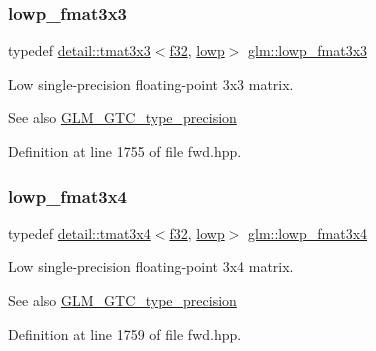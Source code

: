 \subsubsection{\texorpdfstring{lowp\+\_\+fmat3x3}{lowp\_fmat3x3}}
{\footnotesize\ttfamily typedef \hyperlink{structglm_1_1detail_1_1tmat3x3}{detail\+::tmat3x3}$<$\hyperlink{group__gtc__type__precision_ga0ec999b57f5330d9021256e96038df04}{f32}, \hyperlink{namespaceglm_a0f04f086094c747d227af4425893f545ae161af3fc695e696ce3bf69f7332bc2d}{lowp}$>$ \hyperlink{group__gtc__type__precision_ga25b389b52269f3256f015b4fff5789c2}{glm\+::lowp\+\_\+fmat3x3}}

Low single-\/precision floating-\/point 3x3 matrix. \begin{DoxySeeAlso}{See also}
\hyperlink{group__gtc__type__precision}{G\+L\+M\+\_\+\+G\+T\+C\+\_\+type\+\_\+precision} 
\end{DoxySeeAlso}


Definition at line 1755 of file fwd.\+hpp.

\mbox{\label{group__gtc__type__precision_ga366a3249a72ddc76fb3ee4f2379cf3fb}} 
\subsubsection{\texorpdfstring{lowp\+\_\+fmat3x4}{lowp\_fmat3x4}}
{\footnotesize\ttfamily typedef \hyperlink{structglm_1_1detail_1_1tmat3x4}{detail\+::tmat3x4}$<$\hyperlink{group__gtc__type__precision_ga0ec999b57f5330d9021256e96038df04}{f32}, \hyperlink{namespaceglm_a0f04f086094c747d227af4425893f545ae161af3fc695e696ce3bf69f7332bc2d}{lowp}$>$ \hyperlink{group__gtc__type__precision_ga366a3249a72ddc76fb3ee4f2379cf3fb}{glm\+::lowp\+\_\+fmat3x4}}

Low single-\/precision floating-\/point 3x4 matrix. \begin{DoxySeeAlso}{See also}
\hyperlink{group__gtc__type__precision}{G\+L\+M\+\_\+\+G\+T\+C\+\_\+type\+\_\+precision} 
\end{DoxySeeAlso}


Definition at line 1759 of file fwd.\+hpp.

\mbox{\label{group__gtc__type__precision_ga00dfb85ec53bb5f173747f73d13c1b8b}} 
